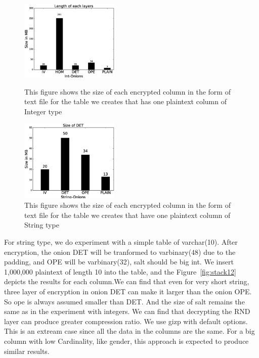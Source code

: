 \begin{figure}   
  \begin{minipage}[t]{0.5\linewidth}  
    \centering   
    \includegraphics[width=4.7cm]{images/size-of-each-onion.eps}   
    \caption{\small{This figure shows the size of each encrypted column in the form of text file for the table we creates that has one plaintext column of Integer type}} 
    \label{fig:side:a}   
  \end{minipage}%
  \begin{minipage}[t]{0.5\linewidth}   
    \centering   
    \includegraphics[width=4.7cm]{images/det-rnd.eps}   
    \caption{\small{This figure shows the size of each encrypted column in the form of text file for the table we creates that have one plaintext column of String type}} 
    \label{fig:side:b}   
  \end{minipage}   
\end{figure}





For string type, we do experiment with a simple table of varchar(10). After encryption, the onion DET will be tranformed to varbinary(48) due to the padding, and OPE will be varbinary(32), salt should be big int. We insert 1,000,000 plaintext of length 10 into the table, and the Figure~\ref{fig:stack12} depicts the results for each column.We can find that even for very short string, three layer of encryption in onion DET can make it larger than the onion OPE. So ope is always assumed  smaller than DET. And the size of salt remains the same as in the experiment with integers. We can find that decrypting the RND layer can produce greater compression ratio. We use gizp with default options. This is an extream case since all the data in the columns are the same. For a big column with low Cardinality, like gender, this approach is expected to produce similar results. 


